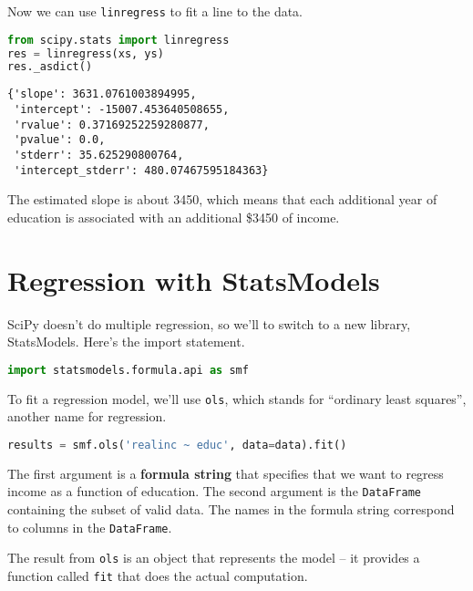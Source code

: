 Now we can use \passthrough{\lstinline!linregress!} to fit a line to the
data.

\begin{lstlisting}[language=Python,style=source]
from scipy.stats import linregress
res = linregress(xs, ys)
res._asdict()
\end{lstlisting}

\begin{lstlisting}[style=output]
{'slope': 3631.0761003894995,
 'intercept': -15007.453640508655,
 'rvalue': 0.37169252259280877,
 'pvalue': 0.0,
 'stderr': 35.625290800764,
 'intercept_stderr': 480.07467595184363}
\end{lstlisting}

The estimated slope is about 3450, which means that each additional year
of education is associated with an additional \$3450 of income.

\section{Regression with StatsModels}\label{regression-with-statsmodels}

SciPy doesn't do multiple regression, so we'll to switch to a new
library, StatsModels. Here's the import statement.

\begin{lstlisting}[language=Python,style=source]
import statsmodels.formula.api as smf
\end{lstlisting}

To fit a regression model, we'll use \passthrough{\lstinline!ols!},
which stands for ``ordinary least squares'', another name for
regression.

\begin{lstlisting}[language=Python,style=source]
results = smf.ols('realinc ~ educ', data=data).fit()
\end{lstlisting}

The first argument is a \textbf{formula string} that specifies that we
want to regress income as a function of education. The second argument
is the \passthrough{\lstinline!DataFrame!} containing the subset of
valid data. The names in the formula string correspond to columns in the
\passthrough{\lstinline!DataFrame!}.

The result from \passthrough{\lstinline!ols!} is an object that
represents the model -- it provides a function called
\passthrough{\lstinline!fit!} that does the actual computation.

\pagebreak

